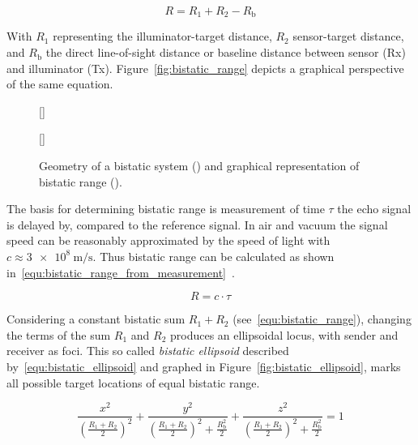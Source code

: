 \begin{equation}\label{equ:bistatic_range}
    R=R_{1}+R_{2}-R_{\text{b}}
\end{equation}

With \(R_{1}\) representing the illuminator-target distance, \(R_{2}\) sensor-target distance, and \(R_{\text{b}}\) the direct line-of-sight distance or baseline distance between sensor (Rx) and illuminator (Tx). Figure~\ref{fig:bistatic_range} depicts a graphical perspective of the same equation.

\begin{figure}[htb]
    \centering
    \subcaptionbox{\label{fig:bistatic_domain}}[\textwidth]{
    }
    \subcaptionbox{\label{fig:bistatic_range}}[\textwidth]{
        \begin{tikzpicture}[x=1cm,y=1cm]
            
        \end{tikzpicture}
    }
    \caption{Geometry of a bistatic system () and graphical representation of bistatic range ().}\label{fig:bistatic_geometry_and_range}
\end{figure}

The basis for determining bistatic range is measurement of time \(\tau\) the echo signal is delayed by, compared to the reference signal. In air and vacuum the signal speed can be reasonably approximated by the speed of light with \(c\approx\SI[per-mode=symbol]{3e8}{\metre\per\second}\). Thus bistatic range can be calculated as shown in~\ref{equ:bistatic_range_from_measurement}~\cite[p.~11]{Malanowski2019}.

\begin{equation}\label{equ:bistatic_range_from_measurement}
    R=c\cdot\tau
\end{equation}

Considering a constant bistatic sum \(R_{1} + R_{2}\) (see~\ref{equ:bistatic_range}), changing the terms of the sum \(R_{1}\) and \(R_{2}\) produces an ellipsoidal locus, with sender and receiver as foci. This so called \emph{bistatic ellipsoid} described by~\ref{equ:bistatic_ellipsoid} and graphed in Figure~\ref{fig:bistatic_ellipsoid}, marks all possible target locations of equal bistatic range.

\begin{equation}\label{equ:bistatic_ellipsoid}
    \frac{x^2}{{\left(\frac{R_{1}+R_{2}}{2}\right)}^2} + \frac{y^2}{{\left(\frac{R_{1}+R_{2}}{2}\right)}^2 + \frac{R_{\text{b}}^2}{2}} + \frac{z^2}{{\left(\frac{R_{1}+R_{2}}{2}\right)}^2 + \frac{R_{\text{b}}^2}{2}} = 1
\end{equation}

